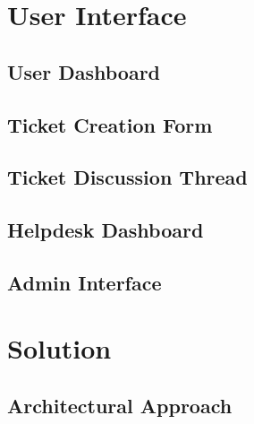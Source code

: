 \documentclass[12pt,a4paper]{article}
\begin{document}
\section{User Interface}


\subsection{User Dashboard}

\subsection{Ticket Creation Form}

\subsection{Ticket Discussion Thread}

\subsection{Helpdesk Dashboard}

\subsection{Admin Interface}

\section{Solution}

\subsection{Architectural Approach}
\end{document}
